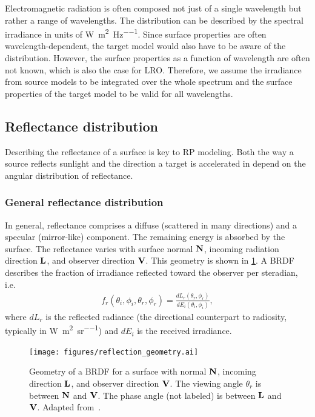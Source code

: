 Electromagnetic radiation is often composed not just of a single wavelength but rather a range of wavelengths. The distribution can be described by the spectral irradiance in units of \unit{\W\per\square\m\per\Hz}. Since surface properties are often wavelength-dependent, the target model would also have to be aware of the distribution. However, the surface properties as a function of wavelength are often not known, which is also the case for \gls{LRO}. Therefore, we assume the irradiance from source models to be integrated over the whole spectrum and the surface properties of the target model to be valid for all wavelengths.




\subsection{Reflectance distribution}
\label{subsec:general-reflectance-distribution}

Describing the reflectance of a surface is key to \gls{RP} modeling. Both the way a source reflects sunlight and the direction a target is accelerated in depend on the angular distribution of reflectance.

\subsubsection{General reflectance distribution}
In general, reflectance comprises a diffuse (scattered in many directions) and a specular (mirror-like) component. The remaining energy is absorbed by the surface. The reflectance varies with surface normal $\vb N$, incoming radiation direction $\vb L$, and observer direction $\vb V$. This geometry is shown in \cref{fig:reflection-geometry}. A \gls{BRDF} describes the fraction of irradiance reflected toward the observer per steradian, i.e.~\cite{Wetterer2014}
\begin{align}
    f_r (\theta_i, \phi_i, \theta_r, \phi_r)
    = \frac{dL_r(\theta_r, \phi_r)}
    {dE_i(\theta_i, \phi_i)},
\end{align}
where $dL_r$ is the reflected radiance (the directional counterpart to radiosity, typically in \unit{\W\per\square\m\per\steradian}) and $dE_i$ is the received irradiance.


\begin{figure}[b]
    \centering
    \texttt{[image: figures/reflection\_geometry.ai]}
    \caption{Geometry of a \gls{BRDF} for a surface with normal $\vb N$, incoming direction $\vb L$, and observer direction $\vb V$. The viewing angle $\theta_r$ is between $\vb N$ and $\vb V$. The phase angle (not labeled) is between $\vb L$ and $\vb V$. Adapted from~\cite{Wetterer2014}.}
    \label{fig:reflection-geometry}
\end{figure}

